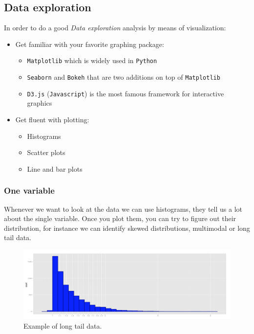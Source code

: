 \subsection{Data exploration}

In order to do a good \emph{Data exploration} analysis by means of visualization:

\begin{itemize}
\item {Get familiar with your favorite graphing package:}
\begin{itemize}
\item \texttt{Matplotlib} which is widely used in \texttt{Python}
\item \texttt{Seaborn} and \texttt{Bokeh} that are two additions on top of \texttt{Matplotlib}
\item \texttt{D3.js} (\texttt{Javascript}) is the most famous framework for interactive graphics
\end{itemize}
\item {Get fluent with plotting:}
\begin{itemize}
\item Histograms
\item Scatter plots
\item Line and bar plots
\end{itemize}
\end{itemize} 

\subsubsection{One variable}

Whenever we want to look at the data we can use histograms, they tell us a lot about the single variable. Once you plot them, you can try to figure out their distribution, for instance we can identify skewed distributions, multimodal or long tail data. 

\begin{figure}[H]%
 \centering
 \includegraphics[width=13cm]{./img/06/long_tail}
 \caption{\label{pic:long_tail} Example of long tail data.}
\end{figure}

